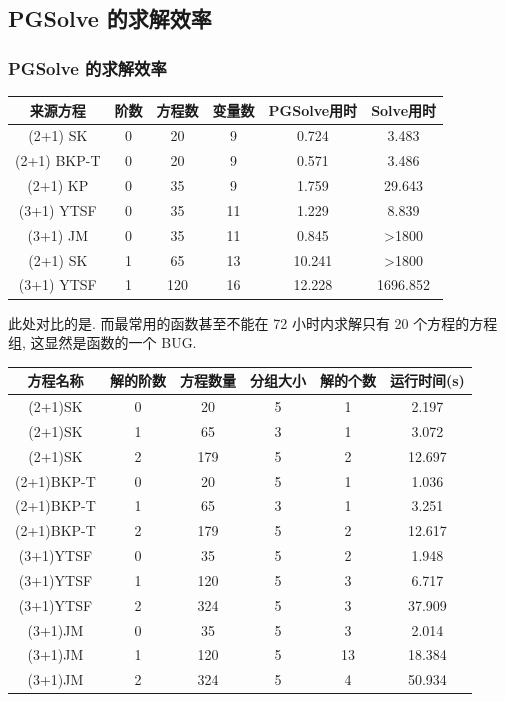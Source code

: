 \subsection{PGSolve 的求解效率}
\begin{frame}
\frametitle{PGSolve 的求解效率}
\begin{adjustbox}{max width=\textwidth}
\centering
\renewcommand{\arraystretch}{1.3}
\begin{tabular}{cccccc}
\hline
来源方程 & 阶数 & 方程数 & 变量数 & PGSolve用时 & Solve用时 \\
\hline
(2+1) SK & 0 & 20 & 9 & 0.724 & 3.483 \\
(2+1) BKP-T & 0 & 20 & 9 & 0.571 & 3.486 \\
(2+1) KP & 0 & 35 & 9 & 1.759 & 29.643 \\
(3+1) YTSF & 0 & 35 & 11 & 1.229 & 8.839 \\
(3+1) JM & 0 & 35 & 11 & 0.845 & >1800 \\
(2+1) SK & 1 & 65 & 13 & 10.241 & >1800 \\
(3+1) YTSF & 1 & 120 & 16 & 12.228 & 1696.852 \\
\hline
\end{tabular}
\end{adjustbox}

\vspace{1em}

此处对比的是. 而最常用的函数甚至不能在 72 小时内求解只有 20 个方程的方程组, 这显然是函数的一个 BUG.

\end{frame}

\begin{frame}

\begin{adjustbox}{max width=\textwidth}
\renewcommand{\arraystretch}{1.3}
\begin{tabular}{cccccc}
\hline
方程名称    & 解的阶数 & 方程数量 & 分组大小 & 解的个数 & 运行时间(s) \\ 
\hline 
(2+1)SK & 0 & 20 & 5 & 1 & 2.197 \\
(2+1)SK & 1 & 65 & 3 & 1 & 3.072 \\
(2+1)SK & 2 & 179 & 5 & 2 & 12.697 \\
(2+1)BKP-T & 0 & 20 & 5 & 1 & 1.036 \\
(2+1)BKP-T & 1 & 65 & 3 & 1 & 3.251 \\
(2+1)BKP-T & 2 & 179 & 5 & 2 & 12.617 \\
(3+1)YTSF & 0 & 35 & 5 & 2 & 1.948 \\
(3+1)YTSF & 1 & 120 & 5 & 3 & 6.717 \\
(3+1)YTSF & 2 & 324 & 5 & 3 & 37.909 \\
(3+1)JM & 0 & 35 & 5 & 3 & 2.014 \\
(3+1)JM & 1 & 120 & 5 & 13 & 18.384 \\
(3+1)JM & 2 & 324 & 5 & 4 & 50.934 \\
\hline 
\end{tabular}
\end{adjustbox}

\end{frame}